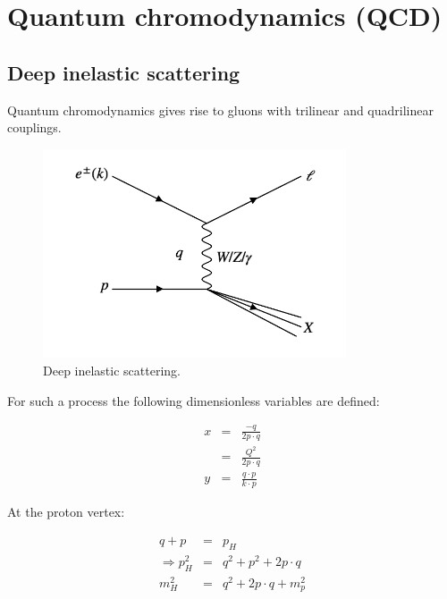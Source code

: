 \chapter{Quantum chromodynamics (QCD)}

\section{Deep inelastic scattering}

Quantum chromodynamics gives rise to gluons with trilinear and quadrilinear couplings.

\begin{figure}[!htb]
  \begin{center}
    \includegraphics[width=0.8\textwidth]{images/web_feynman/image_60.png}
    \caption[Deep inelastic scattering]{Deep inelastic scattering.}
    \label{fig:ch14_DIS}
  \end{center}
\end{figure}

For such a process the following dimensionless variables are defined:

\begin{eqnarray*}
  x & = & \frac{-q}{2p \cdot q} \\
  & = & \frac{Q^2}{2p \cdot q} \\
  y & = & \frac{q \cdot p}{k \cdot p}
\end{eqnarray*}

At the proton vertex:

\begin{eqnarray*}
  q + p & = & p_H \\
  \Rightarrow p_H^2 & = & q^2 + p^2 + 2p \cdot q \\
  m_H^2 & = & q^2 + 2p \cdot q + m_p^2
\end{eqnarray*}

